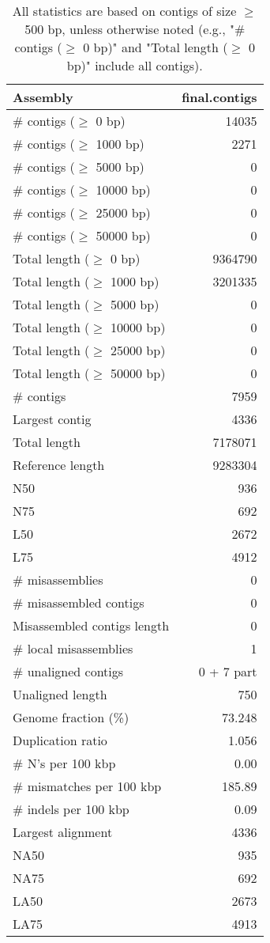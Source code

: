 \documentclass[12pt,a4paper]{article}
\begin{document}
\begin{table}[ht]
\begin{center}
\caption{All statistics are based on contigs of size $\geq$ 500 bp, unless otherwise noted (e.g., "\# contigs ($\geq$ 0 bp)" and "Total length ($\geq$ 0 bp)" include all contigs).}
\begin{tabular}{|l*{1}{|r}|}
\hline
Assembly & final.contigs \\ \hline
\# contigs ($\geq$ 0 bp) & 14035 \\ \hline
\# contigs ($\geq$ 1000 bp) & 2271 \\ \hline
\# contigs ($\geq$ 5000 bp) & 0 \\ \hline
\# contigs ($\geq$ 10000 bp) & 0 \\ \hline
\# contigs ($\geq$ 25000 bp) & 0 \\ \hline
\# contigs ($\geq$ 50000 bp) & 0 \\ \hline
Total length ($\geq$ 0 bp) & 9364790 \\ \hline
Total length ($\geq$ 1000 bp) & 3201335 \\ \hline
Total length ($\geq$ 5000 bp) & 0 \\ \hline
Total length ($\geq$ 10000 bp) & 0 \\ \hline
Total length ($\geq$ 25000 bp) & 0 \\ \hline
Total length ($\geq$ 50000 bp) & 0 \\ \hline
\# contigs & 7959 \\ \hline
Largest contig & 4336 \\ \hline
Total length & 7178071 \\ \hline
Reference length & 9283304 \\ \hline
N50 & 936 \\ \hline
N75 & 692 \\ \hline
L50 & 2672 \\ \hline
L75 & 4912 \\ \hline
\# misassemblies & 0 \\ \hline
\# misassembled contigs & 0 \\ \hline
Misassembled contigs length & 0 \\ \hline
\# local misassemblies & 1 \\ \hline
\# unaligned contigs & 0 + 7 part \\ \hline
Unaligned length & 750 \\ \hline
Genome fraction (\%) & 73.248 \\ \hline
Duplication ratio & 1.056 \\ \hline
\# N's per 100 kbp & 0.00 \\ \hline
\# mismatches per 100 kbp & 185.89 \\ \hline
\# indels per 100 kbp & 0.09 \\ \hline
Largest alignment & 4336 \\ \hline
NA50 & 935 \\ \hline
NA75 & 692 \\ \hline
LA50 & 2673 \\ \hline
LA75 & 4913 \\ \hline
\end{tabular}
\end{center}
\end{table}
\end{document}
